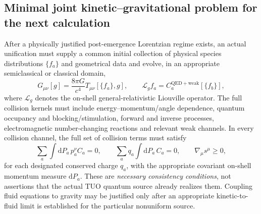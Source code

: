 \documentclass[11pt,a4paper]{article}
\newcommand{\dd}{\mathrm{d}}
\theoremstyle{tmon}
\theoremstyle{definition}
\begin{document}
\subsection{Minimal joint kinetic--gravitational problem for the next calculation}
After a physically justified post-emergence Lorentzian regime exists, an actual unification must supply a common initial collection of physical species distributions $\{f_a\}$ and geometrical data and evolve, in an appropriate semiclassical or classical domain,
\begin{equation}
 G_{\mu\nu}[g]=\frac{8\pi G}{c^4}T_{\mu\nu}[\{f_a\},g],\qquad
 \mathcal{L}_g f_a=C^{\mathrm{QED+weak}}_a[\{f_b\}],
 \label{eq:post-n006-joint}
\end{equation}
where $\mathcal L_g$ denotes the on-shell general-relativistic Liouville operator. The full collision kernels must include energy--momentum/angle dependence, quantum occupancy and blocking/stimulation, forward and inverse processes, electromagnetic number-changing reactions and relevant weak channels. In every collision channel, the full set of collision terms must satisfy
\begin{equation}
 \sum_a\int\dd P_a\,p_a^\nu C_a=0,
 \qquad \sum_a q_a\int\dd P_a\, C_a=0,
 \qquad \nabla_\mu s^\mu\ge0,
 \label{eq:post-n006-sumrules}
\end{equation}
for each designated conserved charge $q_a$, with the appropriate covariant on-shell momentum measure $\dd P_a$. These are \emph{necessary consistency conditions}, not assertions that the actual TUO quantum source already realizes them. Coupling fluid equations to gravity may be justified only after an appropriate kinetic-to-fluid limit is established for the particular nonuniform source.
\end{document}
